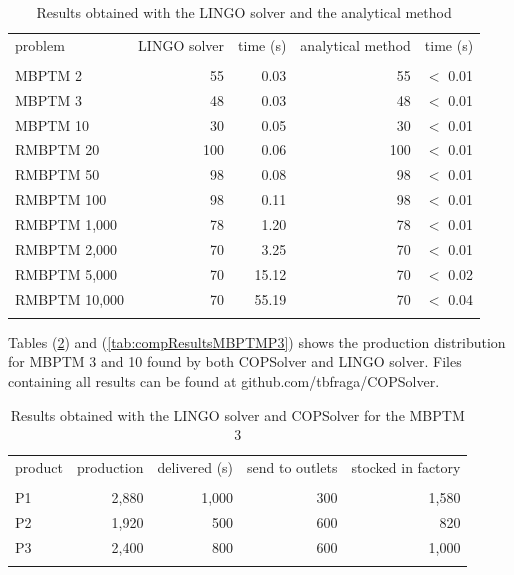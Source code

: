 \documentclass[10pt,fleqn,a4paper,twoside]{article}
\begin{document}
\begin{table}[h]
\begin{center}
\begin{footnotesize}
\begin{tabular}[c]{l r r r r}
problem & LINGO solver & time (s) & analytical method & time (s) \\
\cline {1-5} \\
MBPTM 2 & 55 & 0.03 & 55 & $<$ 0.01 \\
MBPTM 3 & 48 & 0.03 & 48 & $<$ 0.01 \\
MBPTM 10 & 30 & 0.05 & 30 & $<$ 0.01 \\
RMBPTM 20 & 100 & 0.06 & 100 & $<$ 0.01 \\
RMBPTM 50 & 98 & 0.08 & 98 & $<$ 0.01 \\
RMBPTM 100 & 98 & 0.11 & 98 & $<$ 0.01 \\
RMBPTM 1,000 & 78 & 1.20 & 78 & $<$ 0.01 \\
RMBPTM 2,000 & 70 & 3.25 & 70 & $<$ 0.01 \\
RMBPTM 5,000 & 70 & 15.12 & 70 & $<$ 0.02 \\
RMBPTM 10,000 & 70 & 55.19 & 70 & $<$ 0.04 \\
\cline {1-5} \\
\end{tabular}
\caption{Results obtained with the LINGO solver and the analytical method}
\label{tab:results}
\end{footnotesize}
\end{center}
\end{table}

Tables (\ref{tab:compResultsMBPTMP2}) and (\ref{tab:compResultsMBPTMP3}) shows the production distribution for MBPTM 3 and 10 found by both COPSolver and LINGO solver. Files containing all results can be found at github.com/tbfraga/COPSolver.

\begin{table}[h]
\begin{center}
\begin{footnotesize}
\begin{tabular}[c]{l r r r r}
product & production & delivered (s) & send to outlets & stocked in factory \\
\cline {1-5} \\
P1 & 2,880 & 1,000 & 300 & 1,580 \\
P2 & 1,920 & 500 & 600 & 820 \\
P3 & 2,400 & 800 & 600 & 1,000 \\
\cline {1-5} \\
\end{tabular}
\caption{Results obtained with the LINGO solver and COPSolver for the MBPTM 3}
\label{tab:compResultsMBPTMP2}
\end{footnotesize}
\end{center}
\end{table}
\end{document}
